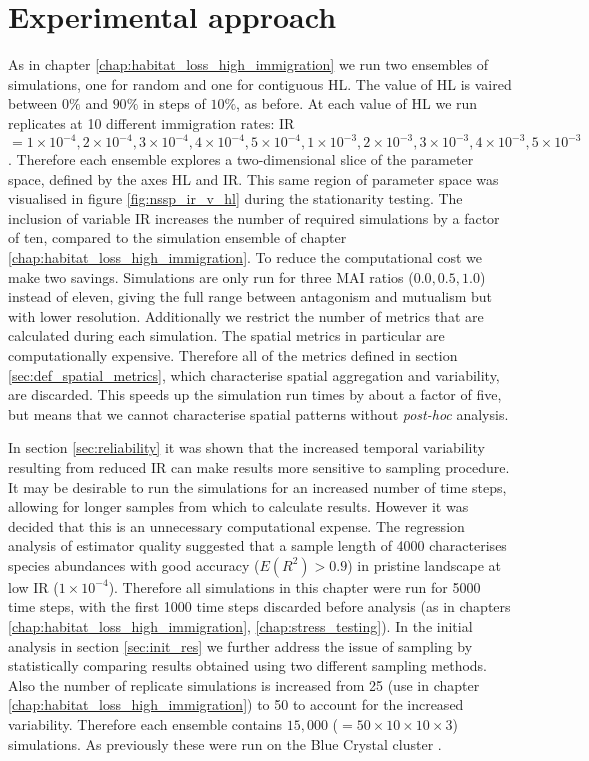 \section{Experimental approach}
\label{sec:exp_method}

As in chapter \ref{chap:habitat_loss_high_immigration} we run two ensembles of simulations, one for random and one for contiguous HL. The value of HL  is vaired between $0\%$ and $90\%$ in steps of $10\%$, as before. At each value of HL we run replicates at 10 different immigration rates: IR$ = 1 \times 10^{-4},2 \times 10^{-4},3 \times 10^{-4},4 \times 10^{-4},5 \times 10^{-4},1 \times 10^{-3},2 \times 10^{-3},3 \times 10^{-3},4 \times 10^{-3},5 \times 10^{-3}$. Therefore each ensemble explores a two-dimensional slice of the parameter space, defined by the axes HL and IR. This same region of parameter space was visualised in figure \ref{fig:nssp_ir_v_hl} during the stationarity testing. The inclusion of variable IR increases the number of required simulations by a factor of ten, compared to the simulation ensemble of chapter \ref{chap:habitat_loss_high_immigration}. To reduce the computational cost we make two savings. Simulations are only run for three MAI ratios ($0.0,0.5,1.0$) instead of eleven, giving the full range between antagonism and mutualism but with lower resolution. Additionally we restrict the number of metrics that are calculated during each simulation. The spatial metrics in particular are computationally expensive. Therefore all of the metrics defined in section \ref{sec:def_spatial_metrics}, which characterise spatial aggregation and variability, are discarded. This speeds up the simulation run times by about a factor of five, but means that we cannot characterise spatial patterns without \emph{post-hoc} analysis.

In section \ref{sec:reliability} it was shown that the increased temporal variability resulting from reduced IR can make results more sensitive to sampling procedure. It may be desirable to run the simulations for an increased number of time steps, allowing for longer samples from which to calculate results. However it was decided that this is an unnecessary computational expense. The regression analysis of estimator quality suggested that a sample length of 4000 characterises species abundances with good accuracy ($E(R^2) > 0.9$) in pristine landscape at low IR ($1 \times 10^{-4}$). Therefore all simulations in this chapter were run for 5000 time steps, with the first 1000 time steps discarded before analysis (as in chapters \ref{chap:habitat_loss_high_immigration}, \ref{chap:stress_testing}). In the initial analysis in section \ref{sec:init_res} we further address the issue of sampling by statistically comparing results obtained using two different sampling methods. Also the number of replicate simulations is increased from 25 (use in chapter \ref{chap:habitat_loss_high_immigration}) to 50 to account for the increased variability. Therefore each ensemble contains $15,000$ ($= 50 \times 10 \times 10 \times 3$) simulations. As previously these were run on the Blue Crystal cluster \cite{BC3}.

